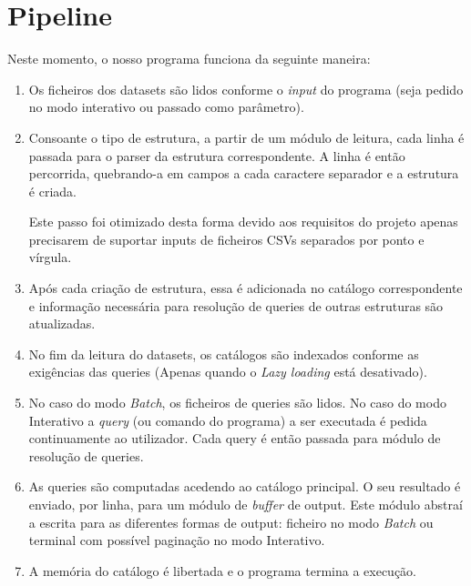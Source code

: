 \documentclass{article}
\begin{document}
    \section{Pipeline}
        Neste momento, o nosso programa funciona da seguinte maneira:
        \begin{enumerate}[\bfseries 1.]
            \item Os ficheiros dos datasets são lidos conforme o \textit{input}
            do programa (seja pedido no modo interativo ou passado como parâmetro).
            \item Consoante o tipo de estrutura, a partir de um módulo de leitura,
            cada linha é passada para o parser da estrutura correspondente.
            A linha é então percorrida, quebrando-a em campos a cada caractere separador
            e a estrutura é criada.
            
            Este passo foi otimizado desta forma devido aos requisitos do projeto apenas precisarem
            de suportar inputs de ficheiros CSVs separados por ponto e vírgula.
            
            \item Após cada criação de estrutura, essa é adicionada no catálogo correspondente
            e informação necessária para resolução de queries de outras estruturas
            são atualizadas.
            
            \item No fim da leitura do datasets, os catálogos são indexados
            conforme as exigências das queries (Apenas quando o \textit{Lazy loading} está desativado). 
        
            \item No caso do modo \textit{Batch}, os ficheiros de queries são lidos. No caso
            do modo Interativo a \textit{query} (ou comando do programa) a ser executada é pedida continuamente ao utilizador.
            Cada query é então passada para módulo de resolução de queries. 
            
            \item As queries são computadas acedendo ao catálogo principal.
            O seu resultado é enviado, por linha, para um módulo de \textit{buffer} de output.
            Este módulo abstraí a escrita para as diferentes formas de output: ficheiro no
            modo \textit{Batch} ou terminal com possível paginação no modo Interativo.
            
            \item A memória do catálogo é libertada e o programa termina a execução.
            
        \end{enumerate}
        
\end{document}
